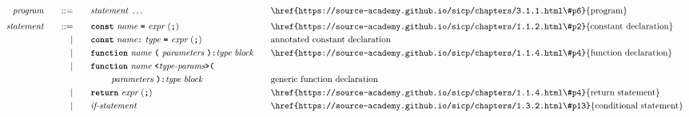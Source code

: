 \begin{alignat*}{9}
&& \textit{program}    &&\quad ::= &\quad && \textit{statement} \ \ldots
                                                           && \textrm{\href{https://source-academy.github.io/sicp/chapters/3.1.1.html\#p6}{program}} \\[1mm]
&& \textit{statement}    &&\quad ::= &\quad && \textbf{\texttt{const}}\  \textit{name} \ 
                                           \textbf{\texttt{=}}\  \textit{expr} \ (\textbf{\texttt{;}})
                                                           && \textrm{\href{https://source-academy.github.io/sicp/chapters/1.1.2.html\#p2}{constant declaration}} \\
&&                       && |   &\quad && \textbf{\texttt{const}}\  \textit{name} \code{:}\ \textit{type} \ 
                                           \textbf{\texttt{=}}\  \textit{expr} \ (\textbf{\texttt{;}})
                                                           && \textrm{annotated constant declaration} \\
&&                       && |   &\quad && \textbf{\texttt{function}}\  \textit{name} \ 
                                   \textbf{\texttt{(}}\  \textit{parameters} \ \textbf{\texttt{):}} \textit{type}\ \textit{block} \quad
                                                           && \textrm{\href{https://source-academy.github.io/sicp/chapters/1.1.4.html\#p4}{function declaration}}\\
&&                       && |   &\quad && \textbf{\texttt{function}}\ \textit{name} \ \code{<} \textit{type-params} \code{>(}
                                                           && \\
&&                       &&     &\quad && \quad\quad\  \textit{parameters} \ \textbf{\texttt{):}} \textit{type}\ \textit{block} \quad
                                                           && \textrm{generic function declaration }\\
&&                       && |   &\quad && \textbf{\texttt{return}}\  \textit{expr} \ (\textbf{\texttt{;}})
                                                           && \textrm{\href{https://source-academy.github.io/sicp/chapters/1.1.4.html\#p4}{return statement}}\\
&&                       && |   &\quad && \textit{if-statement} \quad
                                                           && \textrm{\href{https://source-academy.github.io/sicp/chapters/1.3.2.html\#p13}{conditional statement}}\\

\end{alignat*}
